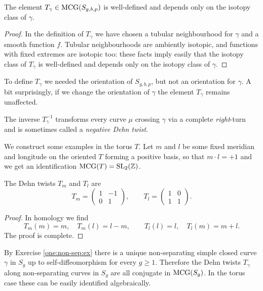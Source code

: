 \begin{prop} The element $T_\gamma \in {\rm MCG}(S_{g,b,p})$ is well-defined and depends only on the isotopy class of $\gamma$.
\end{prop}
\begin{proof}
In the definition of $T_\gamma$ we have chosen a tubular neighbourhood for $\gamma$ and a smooth function $f$. Tubular neighbourhoods are ambiently isotopic, and functions with fixed extremes are isotopic too: these facts imply easily that the isotopy class of $T_\gamma$ is well-defined and depends only on the isotopy class of $\gamma$.
\end{proof}

\begin{oss} To define $T_\gamma$ we needed the orientation of $S_{g,b,p}$, but not an orientation for $\gamma$. A bit surprisingly, if we change the orientation of $\gamma$ the element $T_\gamma$ remains unaffected. 

The inverse $T_\gamma^{-1}$ transforms every curve $\mu$ crossing $\gamma$ via a complete \emph{right}-turn and is sometimes called a \emph{negative Dehn twist}.
\end{oss}

We construct some examples in the torus $T$.
Let $m$ and $l$ be some fixed meridian and longitude on the oriented $T$ forming a positive basis, so that $m\cdot l = +1$ and we get an identification ${\rm MCG}(T) = {\rm SL}_2(\mathbb{Z})$.

\begin{prop}
The Dehn twists $T_m$ and $T_l$ are
$$T_m=\begin{pmatrix} 1 & {-1} \\ 0 & 1 \end{pmatrix}, \qquad T_l = \begin{pmatrix} 1 & 0 \\ 1 & 1 \end{pmatrix}.$$
\end{prop}
\begin{proof}
In homology we find
$$T_m(m) = m, \quad T_m(l) = l-m, \qquad T_l(l) = l, \quad T_l(m) =m+l.$$
The proof is complete.
\end{proof}

By Exercise \ref{one:non-sep:ex} there is a unique non-separating simple closed curve $\gamma$ in $S_g$ up to self-diffeomorphism for every $g\geq 1$. Therefore the Dehn twists $T_\gamma$ along non-separating curves in $S_g$ are all conjugate in ${\rm MCG}(S_g)$. In the torus case these can be easily identified algebraically.

